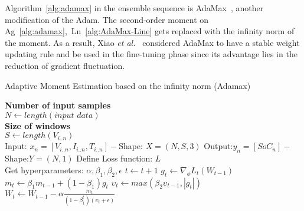 %
\mbox{Algorithm~\ref{alg:adamax}} in the ensemble sequence is AdaMax~\cite{kingma_adam_2017}, another modification of the Adam.
The second-order moment on \mbox{Ag~\ref{alg:adamax}, Ln~\ref{alg:AdaMax-Line}} gets replaced with the infinity norm of the moment.
As a result, Xiao \textit{et al.}~\cite{xiao_accurate_2019} considered AdaMax to have a stable weight updating rule and be used in the fine-tuning phase since its advantage lies in the reduction of gradient fluctuation. 
\begin{algorithm}
    \caption{Adaptive Moment Estimation based on the infinity norm (Adamax)}
    \begin{algorithmic}[1]
      \STATE \textbf{Number of input samples} \\ $N\gets length(\textit{input data})$\\
      \STATE \textbf{Size of windows} \\ $S\gets length(V_{i..n})$\\
      \STATE Input: $x_n = [V_{i..n}, I_{i..n}, T_{i..n}] - $Shape: $X = (N, S, 3)$
      \STATE Output:$y_n = [SoC_{n}] - $Shape:$Y = (N, 1)$
      \STATE Define Loss function: $L$ \\
             Get hyperparameters: $\alpha, \beta_1, \beta_2, \epsilon$
      \STATE $t \gets t+1$
      \STATE $g_t \gets \nabla_\phi L_t (W_{t-1})$ 
      \STATE $m_t \gets \beta_1 m_{t-1}+(1-\beta_1) g_t $ 
      \STATE $\upsilon_t \gets max\left(\beta_2\upsilon_{t-1}, |g_t|\right) $ 
      \STATE $W_t \gets W_{t-1}- \alpha \frac{m_t}{(1-\beta^t_1)(\upsilon_t+\epsilon)} $ 
      \ENDWHILE
    \end{algorithmic}
    \label{alg:adamax}
\end{algorithm}

